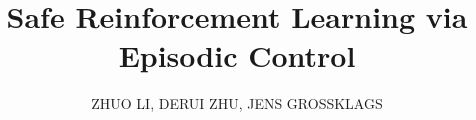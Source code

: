 %
% 



\setcounter{section}{0}
\title{Safe Reinforcement Learning via Episodic Control}

\author{ZHUO LI, DERUI ZHU, JENS GROSSKLAGS}

%


%

\maketitle

